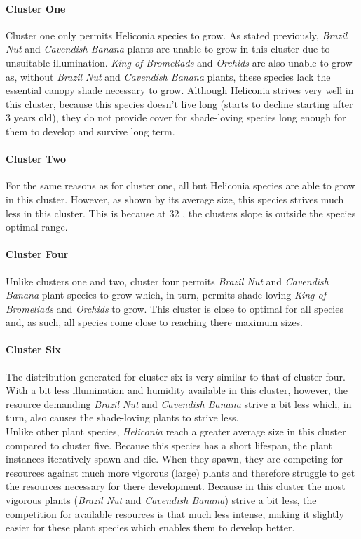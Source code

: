 \paragraph{Cluster One}
Cluster one only permits Heliconia species to grow. As stated previously, \textit{Brazil Nut} and \textit{Cavendish Banana} plants are unable to grow in this cluster due to unsuitable illumination. \textit{King of Bromeliads} and \textit{Orchids} are also unable to grow as, without \textit{Brazil Nut} and \textit{Cavendish Banana} plants, these species lack the essential canopy shade necessary to grow. Although Heliconia strives very well in this cluster, because this species doesn't live long (starts to decline starting after 3 years old), they do not provide cover for shade-loving species long enough for them to develop and survive long term.

\paragraph{Cluster Two}

For the same reasons as for cluster one, all but Heliconia species are able to grow in this cluster. However, as shown by its average size, this species strives much less in this cluster. This is because at 32 \textdegree, the clusters slope is outside the species optimal range.

\paragraph{Cluster Four}

Unlike clusters one and two, cluster four permits \textit{Brazil Nut} and \textit{Cavendish Banana} plant species to grow which, in turn, permits shade-loving \textit{King of Bromeliads} and \textit{Orchids} to grow. This cluster is close to optimal for all species and, as such, all species come close to reaching there maximum sizes.

\paragraph{Cluster Six}

The distribution generated for cluster six is very similar to that of cluster four. With a bit less illumination and humidity available in this cluster, however, the resource demanding \textit{Brazil Nut} and \textit{Cavendish Banana} strive a bit less which, in turn, also causes the shade-loving plants to strive less.\\
Unlike other plant species, \textit{Heliconia} reach a greater average size in this cluster compared to cluster five. Because this species has a short lifespan, the plant instances iteratively spawn and die. When they spawn, they are competing for resources against much more vigorous (large) plants and therefore struggle to get the resources necessary for there development. Because in this cluster the most vigorous plants (\textit{Brazil Nut} and \textit{Cavendish Banana}) strive a bit less, the competition for available resources is that much less intense, making it slightly easier for these plant species which enables them to develop better.\\


